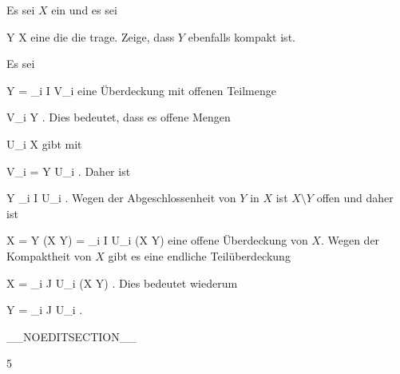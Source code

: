 {

Es sei $X$ ein
und es sei

\mavergleichskette
{\vergleichskette
{Y
}
{ \subseteq }{ X
}
{  }{
}
{    }{
}
{   }{
}
}
{}{}{}
eine
die die
trage. Zeige, dass $Y$ ebenfalls kompakt ist.

}
{

Es sei

\mavergleichskettedisp
{\vergleichskette
{ Y
}
{ =} { \bigcup_{i \in I} V_i
}
{ } {
}
{ } {
}
{ } {
}
}
{}{}{}
eine Überdeckung mit offenen Teilmenge

\mavergleichskette
{\vergleichskette
{ V_i
}
{ \subseteq }{ Y
}
{  }{
}
{    }{
}
{   }{
}
}
{}{}{.}
Dies bedeutet, dass es offene Mengen

\mavergleichskette
{\vergleichskette
{ U_i
}
{ \subseteq }{ X
}
{  }{
}
{    }{
}
{   }{
}
}
{}{}{}
gibt mit

\mavergleichskette
{\vergleichskette
{ V_i
}
{ = }{ Y \cap U_i
}
{  }{
}
{    }{
}
{   }{
}
}
{}{}{.}
Daher ist

\mavergleichskettedisp
{\vergleichskette
{ Y
}
{ \subseteq} { \bigcup_{i \in I} U_i
}
{ } {
}
{ } {
}
{ } {
}
}
{}{}{.}
Wegen der Abgeschlossenheit von $Y$ in $X$ ist $X \setminus Y$ offen und daher ist

\mavergleichskettedisp
{\vergleichskette
{ X
}
{ =} { Y \cup (X \setminus Y)
}
{ =} { \bigcup_{i \in I} U_i  \cup  (X \setminus Y)
}
{ } {
}
{ } {
}
}
{}{}{}
eine offene Überdeckung von $X$. Wegen der Kompaktheit von $X$ gibt es eine endliche Teilüberdeckung

\mavergleichskettedisp
{\vergleichskette
{ X
}
{ =} { \bigcup_{i \in J} U_i  \cup  (X \setminus Y)
}
{ } {
}
{ } {
}
{ } {}
}
{}{}{.}
Dies bedeutet wiederum

\mavergleichskettedisp
{\vergleichskette
{ Y
}
{ =} { \bigcup_{i \in J} U_i
}
{ } {
}
{ } {
}
{ } {}
}
{}{}{.}

 }

__NOEDITSECTION__

{5}

